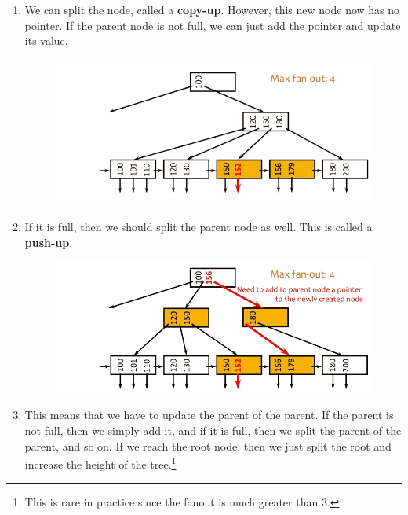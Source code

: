 \begin{algo}[Insertion]
\begin{enumerate}
        \item We can split the node, called a \textbf{copy-up}. However, this new node now has no pointer. If the parent node is not full, we can just add the pointer and update its value. 

        \begin{figure}[H]
          \centering 
          \includegraphics[scale=0.4]{img/insertion_2.png}
          \caption{} 
          \label{fig:insertion_2}
        \end{figure}

        \item If it is full, then we should split the parent node as well. This is called a \textbf{push-up}. 

        \begin{figure}[H]
          \centering 
          \includegraphics[scale=0.4]{img/insertion_3.png}
          \caption{} 
          \label{fig:insertion_3.png}
        \end{figure}

        \item This means that we have to update the parent of the parent. If the parent is not full, then we simply add it, and if it is full, then we split the parent of the parent, and so on. If we reach the root node, then we just split the root and increase the height of the tree.\footnote{This is rare in practice since the fanout is much greater than 3.}
      \end{enumerate}
    \end{algo}

